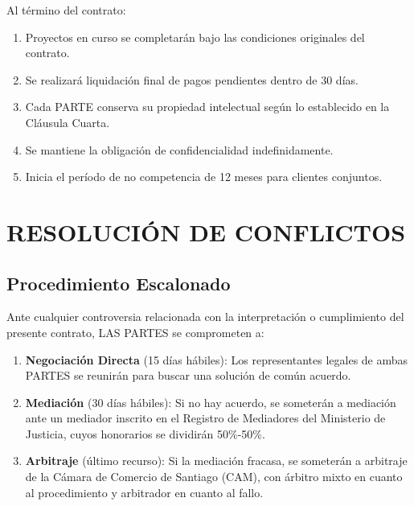\documentclass[11pt,letterpaper]{article}
\begin{document}
Al término del contrato:

\begin{enumerate}[label=\arabic*.]
    \item Proyectos en curso se completarán bajo las condiciones originales del contrato.
    \item Se realizará liquidación final de pagos pendientes dentro de 30 días.
    \item Cada PARTE conserva su propiedad intelectual según lo establecido en la Cláusula Cuarta.
    \item Se mantiene la obligación de confidencialidad indefinidamente.
    \item Inicia el período de no competencia de 12 meses para clientes conjuntos.
\end{enumerate}


\section{RESOLUCIÓN DE CONFLICTOS}

\subsection{Procedimiento Escalonado}

Ante cualquier controversia relacionada con la interpretación o cumplimiento del presente contrato, LAS PARTES se comprometen a:

\begin{enumerate}[label=\textbf{Etapa \arabic*:}]
    \item \textbf{Negociación Directa} (15 días hábiles): Los representantes legales de ambas PARTES se reunirán para buscar una solución de común acuerdo.
    
    \item \textbf{Mediación} (30 días hábiles): Si no hay acuerdo, se someterán a mediación ante un mediador inscrito en el Registro de Mediadores del Ministerio de Justicia, cuyos honorarios se dividirán 50\%-50\%.
    
    \item \textbf{Arbitraje} (último recurso): Si la mediación fracasa, se someterán a arbitraje de la Cámara de Comercio de Santiago (CAM), con árbitro mixto en cuanto al procedimiento y arbitrador en cuanto al fallo.
\end{enumerate}
\end{document}
